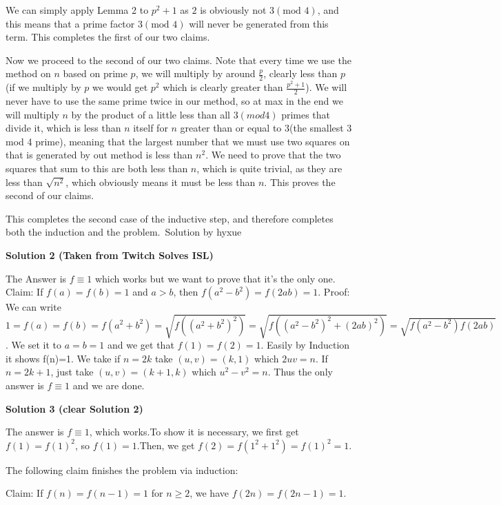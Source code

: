 \begin{enumerate}
 We can simply apply Lemma 2 to $p^2+1$ as $2$ is obviously not $3(\text{mod } 4)$, and this means that a prime factor $3(\text{mod } 4)$ will never be generated from this term. This completes the first of our two claims.

 Now we proceed to the second of our two claims. Note that every time we use the method on $n$ based on prime $p$, we will multiply by around $\frac{p}{2}$, clearly less than $p$(if we multiply by $p$ we would get $p^2$ which is clearly greater than $\frac{p^2+1}{2}$). We will never have to use the same prime twice in our method, so at max in the end we will multiply $n$ by the product of a little less than all $3(mod 4)$ primes that divide it, which is less than $n$ itself for $n$ greater than or equal to $3$(the smallest 3 mod 4 prime), meaning that the largest number that we must use two squares on that is generated by out method is less than $n^2$. We need to prove that the two squares that sum to this are both less than $n$, which is quite trivial, as they are less than $\sqrt{n^2}$, which obviously means it must be less than $n$. This proves the second of our claims.

 This completes the second case of the inductive step, and therefore completes both the induction and the problem.~Solution by hyxue

 



\textbf{Solution 2 (Taken from Twitch Solves ISL)}

The Answer is $\boxed{f\equiv 1}$ which works but we want to prove that it's the only one. Claim: If $f(a)=f(b)=1$ and $a>b$, then $f(a^2-b^2)= f(2ab)= 1$. Proof: We can write $1=f(a)=f(b)= f(a^2+b^2)= \sqrt{f((a^2+b^2)^2)} = \sqrt{f((a^2-b^2)^2+ (2ab)^2)} = \sqrt{f(a^2-b^2)f(2ab)}$. We set it to $a=b=1$ and we get that $f(1)=f(2)=1$. Easily by Induction it shows f(n)=1. We take if $n=2k$ take $(u,v)=(k,1)$ which $2uv=n$. If $n=2k+1$, just take $(u,v)= (k+1,k)$ which $u^2-v^2=n$. Thus the only answer is $\boxed{f\equiv 1}$ and we are done.

 



\textbf{Solution 3 (clear Solution 2)}

The answer is $\boxed{f\equiv 1}$, which works.To show it is necessary, we first get $f(1)=f(1)^2$, so $f(1)=1$.Then, we get $f(2)=f(1^2 + 1^2)=f(1)^2 =1$.

 The following claim finishes the problem via induction:

 Claim: If $f(n)=f(n-1)=1$ for $n \ge 2$, we have $f(2n)=f(2n-1)=1$.


\end{enumerate}
